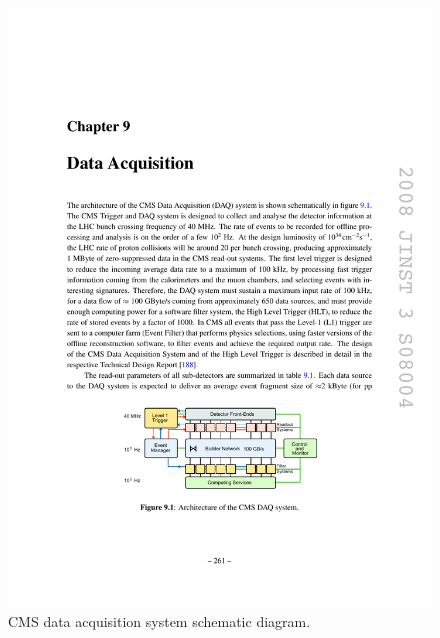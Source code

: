 \begin{figure}[tbh]
\centering
\includegraphics[width=5.5in]{figures/daq.pdf}
\caption{CMS data acquisition system schematic diagram.}
\label{fig:daq}
\end{figure}

